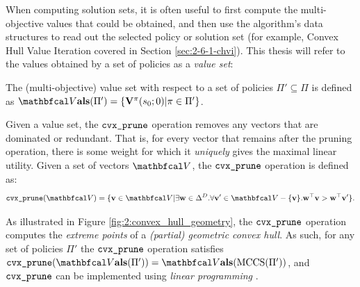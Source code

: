 When computing solution sets, it is often useful to first compute the multi-objective values that could be obtained, and then use the algorithm's data structures to read out the selected policy or solution set (for example, Convex Hull Value Iteration covered in Section \ref{sec:2-6-1-chvi}). This thesis will refer to the values obtained by a set of policies as a \textit{value set}:
\begin{defn}
    \label{def:2:mo_value_set}
    The \textnormal{(multi-objective) value set} with respect to a set of policies $\Pi'\subseteq\Pi$ is defined as $\valset(\Pi') = \{\bff{V}^{\pi}(s_0;0) | \pi \in \Pi'\}$.
\end{defn}

Given a value set, the ${\textnormal{\texttt{cvx\_prune}}}$ operation removes any vectors that are dominated or redundant. That is, for every vector that remains after the pruning operation, there is some weight for which it \textit{uniquely} gives the maximal linear utility. Given a set of vectors $\bfcl{V}$, the ${\textnormal{\texttt{cvx\_prune}}}$ operation is defined as:
\begin{align}
    \cprune(\bfcl{V}) = \{\bff{v}\in\bfcl{V} | \exists \bff{w}\in\Delta^D. \forall \bff{v}'\in\bfcl{V}-\{\bff{v}\}. \bff{w}^\top \bff{v} > \bff{w}^\top \bff{v}' \}. \label{eq:2:cprune_def}
\end{align}

As illustrated in Figure \ref{fig:2:convex_hull_geometry}, the ${\textnormal{\texttt{cvx\_prune}}}$ operation computes the \textit{extreme points} of a \textit{(partial) geometric convex hull}. As such, for any set of policies $\Pi'$ the ${\textnormal{\texttt{cvx\_prune}}}$ operation satisfies $\cprune(\valset(\Pi')) = \valset(\textnormal{MCCS}(\Pi'))$, and ${\textnormal{\texttt{cvx\_prune}}}$ can be implemented using \textit{linear programming} \cite{cccs}.


